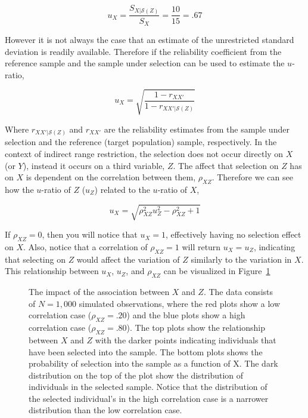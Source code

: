 \documentclass[
  letterpaper,
  DIV=11,
  numbers=noendperiod]{scrreprt}
\begin{document}
\[
u_X =  \frac{S_{X|\mathcal{S}(Z)}}{S_X} = \frac{10}{15}= .67
\]

However it is not always the case that an estimate of the unrestricted
standard deviation is readily available. Therefore if the reliability
coefficient from the reference sample and the sample under selection can
be used to estimate the \(u\)-ratio,

\[
u_X = \sqrt{\frac{1-r_{XX'}}{1-r_{XX'|\mathcal{S}(Z)}}}
\]

Where \(r_{XX'|\mathcal{S}(Z)}\) and \(r_{XX'}\) are the reliability
estimates from the sample under selection and the reference (target
population) sample, respectively. In the context of indirect range
restriction, the selection does not occur directly on \(X\) (or \(Y\)),
instead it occurs on a third variable, \(Z\). The affect that selection
on \(Z\) has on \(X\) is dependent on the correlation between them,
\(\rho_{XZ}\). Therefore we can see how the \(u\)-ratio of \(Z\)
(\(u_Z\)) related to the \(u\)-ratio of \(X\),

\[
u_X = \sqrt{\rho_{XZ}^2u_Z^2 -\rho_{XZ}^2 + 1 }
\]

If \(\rho_{XZ}=0\), then you will notice that \(u_X=1\), effectively
having no selection effect on \(X\). Also, notice that a correlation of
\(\rho_{XZ}=1\) will return \(u_X=u_Z\), indicating that selecting on
\(Z\) would affect the variation of \(Z\) similarly to the variation in
\(X\). This relationship between \(u_X\), \(u_Z\), and \(\rho_{XZ}\) can
be visualized in Figure~\ref{fig-ux-uz}

\begin{figure}[H]


\caption{\label{fig-ux-uz}The impact of the association between \(X\)
and \(Z\). The data consists of \(N=1,000\) simulated observations,
where the red plots show a low correlation case (\(\rho_{XZ}=.20\)) and
the blue plots show a high correlation case (\(\rho_{XZ}=.80\)). The top
plots show the relationship between \(X\) and \(Z\) with the darker
points indicating individuals that have been selected into the sample.
The bottom plots shows the probability of selection into the sample as a
function of X. The dark distribution on the top of the plot show the
distribution of individuals in the selected sample. Notice that the
distribution of the selected individual's in the high correlation case
is a narrower distribution than the low correlation case.}

\end{figure}%
\end{document}
